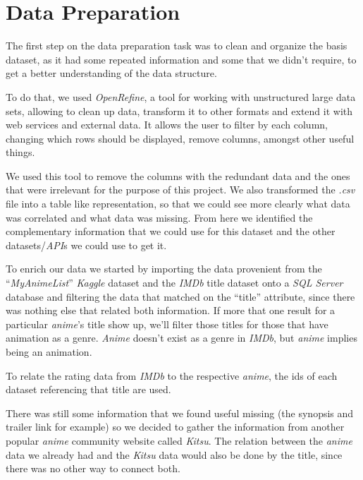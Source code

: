 \documentclass[twocolumn,twoside,11pt,a4paper]{article}
\begin{document}
\section{Data Preparation}\label{preparation}
The first step on the data preparation task was to clean and organize the basis dataset, as it had some repeated information and some that we didn’t require, to get a better understanding of the data structure.
\par
 To do that, we used \textit{OpenRefine}, a tool for working with unstructured large data sets, allowing to clean up data, transform it to other formats and extend it with web services and external data. It allows the user to filter by each column, changing which rows should be displayed, remove columns, amongst other useful things.
\par
We used this tool to remove the columns with the redundant data and the ones that were irrelevant for the purpose of this project. We also transformed the \textit{.csv} file into a table like representation, so that we could see more clearly what data was correlated and what data was missing. From here we identified the complementary information that we could use for this dataset and the other datasets/\textit{API}s we could use to get it.
\par
To enrich our data we started by importing the data provenient from the “\textit{MyAnimeList}” \textit{Kaggle} dataset and the \textit{IMDb} title dataset onto a \textit{SQL Server} database and filtering the data that matched on the “title” attribute, since there was nothing else that related both information. If more that one result for a particular \textit{anime}'s title show up, we'll filter those titles for those that have animation as a genre. \textit{Anime} doesn't exist as a genre in \textit{IMDb}, but \textit{anime} implies being an animation.
\par
To relate the rating data from \textit{IMDb} to the respective \textit{anime}, the ids of each dataset referencing that title are used.
\par
There was still some information that we found useful missing (the synopsis and trailer link for example) so we decided to gather the information from another popular \textit{anime} community website called \textit{Kitsu}. The relation between the \textit{anime} data we already had and the \textit{Kitsu} data would also be done by the title, since there was no other way to connect both.

\end{document}

